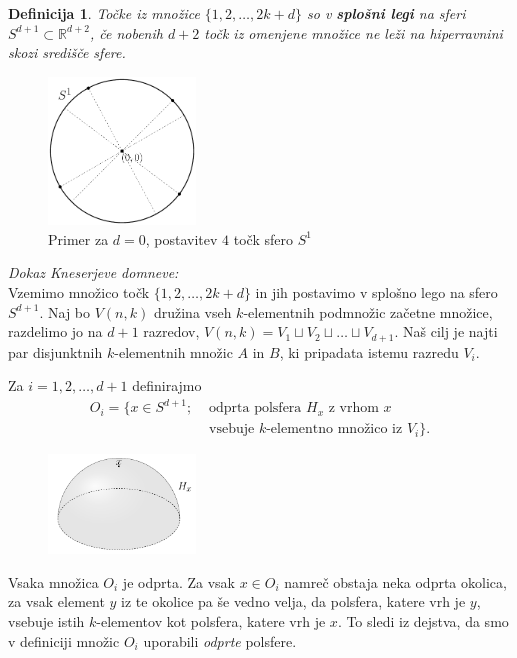 \documentclass[a4paper,12pt]{article}
\newtheorem{definicija}{Definicija}
\begin{document}
\begin{definicija}
Točke iz množice $\{1,2,\ldots,2k+d\}$ so v \textbf {splošni legi} na sferi $S^{d+1} \subset \mathbb{R}^{d+2}$, če nobenih $d+2$ točk iz omenjene množice ne leži na hiperravnini skozi središče sfere.
\end{definicija}

\begin{figure}[h!]
\centering
\includegraphics[width=0.35\textwidth]{splosna_lega}
\caption{Primer za $d=0$, postavitev $4$ točk sfero $S^1$}
\end{figure}


\noindent
{\em Dokaz Kneserjeve domneve:}\\
\indent Vzemimo množico točk $\{1,2,\ldots,2k+d\}$ in jih postavimo v splošno lego na sfero $S^{d+1}$. Naj bo $V(n,k)$ družina vseh $k$-elementnih podmnožic začetne množice, razdelimo jo na $d+1$ razredov, $V(n,k) = V_1 \sqcup V_2 \sqcup \ldots \sqcup V_{d+1}$. Naš cilj je najti par disjunktnih $k$-elementnih množic $A$ in $B$, ki pripadata istemu razredu $V_i$.
\newpage


Za $i=1, 2,\ldots, d+1$ definirajmo
\begin{align*} O_i = \{x \in S^{d+1}; &\text{ odprta polsfera } H_x \text{ z vrhom } x \\ &\text{ vsebuje } k\text{-elementno množico iz } V_i\}.
\end{align*}

\begin{figure}[h]
\centering
\includegraphics[width=0.35\textwidth]{polsfera}
\end{figure}


Vsaka množica $O_i$ je odprta. Za vsak $x \in O_i$ namreč obstaja neka odprta okolica, za vsak element $y$ iz te okolice pa še vedno velja, da polsfera, katere vrh je $y$, vsebuje istih $k$-elementov kot polsfera, katere vrh je $x$. To sledi iz dejstva, da smo v definiciji množic $O_i$ uporabili {\em odprte} polsfere.
\end{document}
